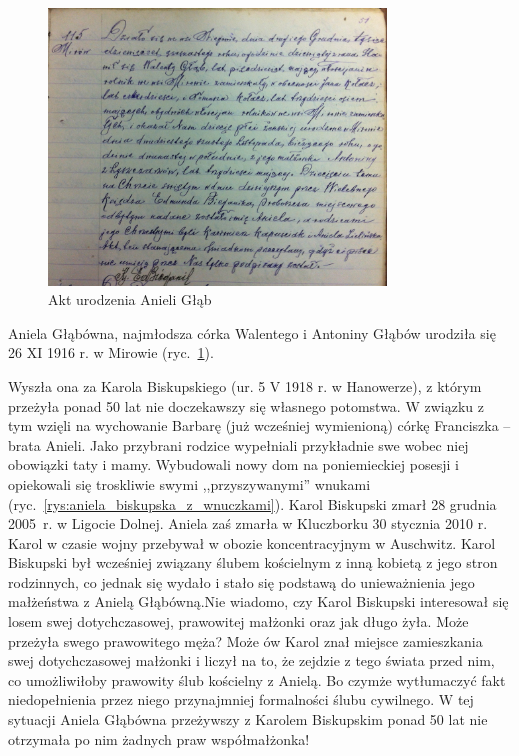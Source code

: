 \begin{figure}[!h]
\begin{center}
\includegraphics[width=0.8\textwidth]{zdjecia/akt_urodzenia_anieli_glab.jpg}
\caption{Akt urodzenia Anieli Głąb}
\label{rys:akt_urodzenia_anieli_glab}
\end{center}
\end{figure}

Aniela Głąbówna, najmłodsza córka Walentego i Antoniny Głąbów urodziła się 26 XI 1916 r. w Mirowie (ryc.~\ref{rys:akt_urodzenia_anieli_glab}).

Wyszła ona za Karola Biskupskiego (ur. 5 V 1918 r. w Hanowerze), z którym przeżyła ponad 50 lat nie doczekawszy się własnego potomstwa. W związku z tym wzięli na wychowanie Barbarę (już wcześniej wymienioną) córkę Franciszka -- brata Anieli. Jako przybrani rodzice wypełniali przykładnie swe wobec niej obowiązki taty i mamy. Wybudowali nowy dom na poniemieckiej posesji i opiekowali się troskliwie swymi ,,przyszywanymi'' wnukami (ryc.~\ref{rys:aniela_biskupska_z_wnuczkami}). Karol Biskupski zmarł 28 grudnia 2005~r. w Ligocie Dolnej. Aniela zaś zmarła w Kluczborku 30 stycznia 2010 r. Karol w czasie wojny przebywał w obozie koncentracyjnym w Auschwitz. Karol Biskupski był wcześniej związany ślubem kościelnym z inną kobietą z jego stron rodzinnych, co jednak się wydało i stało się podstawą do unieważnienia jego małżeństwa z Anielą Głąbówną.Nie wiadomo, czy Karol Biskupski interesował się losem swej dotychczasowej, prawowitej małżonki oraz jak długo żyła. Może przeżyła swego prawowitego męża? Może ów Karol znał miejsce zamieszkania swej dotychczasowej małżonki i liczył na to, że zejdzie z tego świata przed nim, co umożliwiłoby prawowity ślub kościelny z Anielą. Bo czymże wytłumaczyć fakt niedopełnienia przez niego przynajmniej formalności ślubu cywilnego. W tej sytuacji Aniela Głąbówna przeżywszy z Karolem Biskupskim ponad 50 lat nie otrzymała po nim żadnych praw współmałżonka! 


